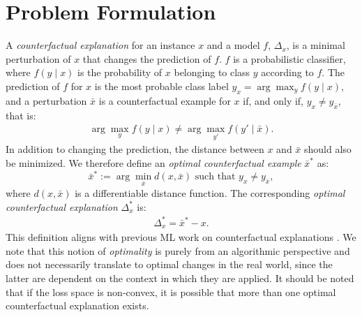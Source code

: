 
\section{Problem Formulation}
\label{section:focus-problem-definition}

A \emph{counterfactual explanation} for an instance $x$ and a model $f$, $\Delta_{x}$, is a minimal perturbation of $x$ that changes the prediction of $f$. 
$f$ is a probabilistic classifier, where $f(y\mid x)$ is the probability of $x$ belonging to class $y$ according to $f$.
The prediction of $f$ for $x$ is the most probable class label $y_x = \arg\max_{y} f(y \mid x)$, and
a perturbation $\bar{x}$ is a counterfactual example for $x$ if, and only if, $y_x \not = y_{\bar{x}}$, that is:
%
\begin{align}
\arg\max_{y} f(y \mid x)
\not =
\arg\max_{y'} f(y' \mid \bar{x}).
\label{eq:cfexample}
\end{align}
%
In addition to changing the prediction, the distance between $x$ and $\bar{x}$ should also be minimized. 
We therefore define an \emph{optimal counterfactual example} $\bar{x}^*$ as: 
\begin{equation}
 \bar{x}^* := \arg\min_{\bar{x}} d(x, \bar{x}) 
 \text{ such that }
y_x \not = y_{\bar{x}},
\label{eq:optimalcondition}
\end{equation}
\noindent
where $d(x, \bar{x})$ is a differentiable distance function. 
The corresponding \emph{optimal counterfactual explanation} $\Delta^*_{x}$ is:
\begin{align}
\Delta^*_{x} = \bar{x}^* - x.
\end{align} 
This definition aligns with previous ML work on counterfactual explanations \citep{laugel_inverse_2017, karimi_model-agnostic_2019, tolomei_interpretable_2017}. 
We note that this notion of \emph{optimality} is purely from an algorithmic perspective and does not necessarily translate to optimal changes in the real world, since the latter are dependent on the context in which they are applied. 
It should be noted that if the loss space is non-convex, it is possible that more than one optimal counterfactual explanation exists.

